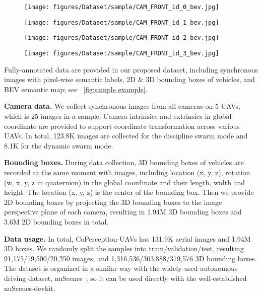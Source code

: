 \documentclass{article}
\begin{document}
\begin{figure*}[]
    \centering
\begin{subfigure}[b]{0.245\textwidth}
        \centering
        \texttt{[image: figures/Dataset/sample/CAM\_FRONT\_id\_0\_bev.jpg]}
    \end{subfigure}
    \hfill
    \begin{subfigure}[b]{0.245\textwidth}
        \centering
        \texttt{[image: figures/Dataset/sample/CAM\_FRONT\_id\_1\_bev.jpg]}
    \end{subfigure}
    \hfill
    \begin{subfigure}[b]{0.245\textwidth}
        \centering
        \texttt{[image: figures/Dataset/sample/CAM\_FRONT\_id\_2\_bev.jpg]}
    \end{subfigure}
    \hfill
    \begin{subfigure}[b]{0.245\textwidth}
        \centering
        \texttt{[image: figures/Dataset/sample/CAM\_FRONT\_id\_3\_bev.jpg]}
    \end{subfigure}
\caption{Data and annotations of one sample. From top to bottom: RGB image, image with 3D bounding boxes, image with  semantic labels, and BEV map with semantic labels. From left to right are from different cameras equipped on four UAVs.}
\label{fig:sample example}
\vspace{-4mm}
\end{figure*}

Fully-annotated data are provided in our proposed dataset, including synchronous images with pixel-wise semantic labels, 2D \& 3D bounding boxes of vehicles, and BEV semantic map; see ~\ref{fig:sample example}.

\textbf{Camera data.} We collect synchronous images from all cameras on 5 UAVs, which is 25 images in a sample. Camera intrinsics and extrinsics in global coordinate are provided to support coordinate transformation across various UAVs. In total, 123.8K images are collected for the discipline swarm mode and 8.1K for the dynamic swarm mode.

\textbf{Bounding boxes.} During data collection, 3D bounding boxes of vehicles are recorded at the same moment with images, including location (x, y, z), rotation (w, x, y, z in quaternion) in the global coordinate and their length, width and height. The location (x, y, z) is the center of the bounding box. Then we provide 2D bounding boxes by projecting the 3D bounding boxes to the image perspective plane of each camera, resulting in 1.94M 3D bounding boxes and 3.6M 2D bounding boxes in total.

\textbf{Data usage.} In total, CoPerception-UAVs has 131.9K aerial images and 1.94M 3D boxes. We randomly split the samples into train/validation/test, resulting 91,175/19,500/20,250 images, and 1,316,536/303,888/319,576 3D bounding boxes. The dataset is organized in a similar way with the widely-used autonomous driving dataset, nuScenes~\cite{nuscenes2019}; so it can be used directly with the well-established nuScenes-devkit.














%
 
\end{document}
